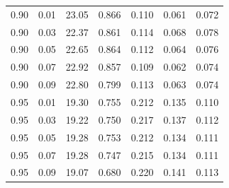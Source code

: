 \begin{table}[htbp]
\begin{tabular}{ccccccc}
0.90 & 0.01 & 23.05 & 0.866 & 0.110 & 0.061 & 0.072 \\
0.90 & 0.03 & 22.37 & 0.861 & 0.114 & 0.068 & 0.078 \\
0.90 & 0.05 & 22.65 & 0.864 & 0.112 & 0.064 & 0.076 \\
0.90 & 0.07 & 22.92 & 0.857 & 0.109 & 0.062 & 0.074 \\
0.90 & 0.09 & 22.80 & 0.799 & 0.113 & 0.063 & 0.074 \\
0.95 & 0.01 & 19.30 & 0.755 & 0.212 & 0.135 & 0.110 \\
0.95 & 0.03 & 19.22 & 0.750 & 0.217 & 0.137 & 0.112 \\
0.95 & 0.05 & 19.28 & 0.753 & 0.212 & 0.134 & 0.111 \\
0.95 & 0.07 & 19.28 & 0.747 & 0.215 & 0.134 & 0.111 \\
0.95 & 0.09 & 19.07 & 0.680 & 0.220 & 0.141 & 0.113 \\
\bottomrule
\end{tabular}
\end{table}

